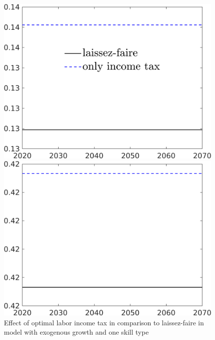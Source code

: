 \begin{figure}[h!!]
	\centering
	\caption{Effect of optimal labor income tax in comparison to laissez-faire in model with exogenous growth and one skill type }\label{fig:LF_vs_onlytaul_xgrnsk}
	\begin{minipage}[]{0.32\textwidth}
		\includegraphics[width=1\textwidth]{../../codding_model/own_basedOnFried/optimalPol_190722_tidiedUp/figures/all_10Aout22/CountTaul_modxgr_nsk_target_GFF_spillover0_sep1_extern0_PV1_etaa0.79_lgd1.png}
	\end{minipage}
	\begin{minipage}[]{0.32\textwidth}
		\includegraphics[width=1\textwidth]{../../codding_model/own_basedOnFried/optimalPol_190722_tidiedUp/figures/all_10Aout22/CountTaul_modxgr_nsk_target_EY_spillover0_sep1_extern0_PV1_etaa0.79_lgd0.png}

\end{minipage}
\end{figure}
